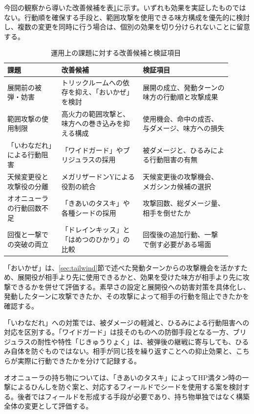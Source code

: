 \documentclass[a4paper,10pt]{ltjsarticle}
\begin{document}
今回の観察から導いた改善候補を表\ref{tab:improvements}に示す。いずれも効果を実証したものではない。行動順を確保する手段と、範囲攻撃を使用できる味方構成を優先的に検討し、複数の変更を同時に行う場合は、個別の効果を切り分けられないことに留意する。

\begin{table}[t]
  \centering
  \caption{運用上の課題に対する改善候補と検証項目}
  \label{tab:improvements}
  \footnotesize
  \setlength{\tabcolsep}{3pt}
  \renewcommand{\arraystretch}{1.18}
  \begin{tabular}{@{}p{0.22\linewidth}p{0.33\linewidth}p{0.36\linewidth}@{}}
    \hline
    課題 & 改善候補 & 検証項目 \\
    \hline
    展開前の被弾・妨害 & トリックルームへの依存を抑え、「おいかぜ」を検討 & 展開の成立、発動ターンの味方の行動順と攻撃成果 \\
    範囲攻撃の使用制限 & 高火力の範囲攻撃と、味方への巻き込みを抑える構成 & 使用機会、命中の成否、与ダメージ、味方への損失 \\
    「いわなだれ」による行動阻害 & 「ワイドガード」やブリジュラスの採用 & 被ダメージと、ひるみによる行動阻害の有無 \\
    天候変更役と攻撃役の分離 & メガリザードンYによる役割の統合 & 天候変更後の攻撃機会、メガシンカ候補の選択 \\
    オオニューラの行動回数不足 & 「きあいのタスキ」や各種シードの採用 & 攻撃回数、総ダメージ量、相手を倒せたか \\
    回復と一撃での突破の両立 & 「ドレインキッス」と「はめつのひかり」の比較 & 回復後の追加行動、一撃で倒す必要がある場面 \\
    \hline
  \end{tabular}
\end{table}

「おいかぜ」は、\ref{sec:tailwind}節で述べた発動ターンからの攻撃機会を活かすため、展開役が相手より先に使用できるかと、効果を受けた味方が相手より先に攻撃できるかを併せて評価する。素早さの設定と展開役への妨害対策を具体化し、発動したターンに攻撃できたか、その攻撃によって相手の行動を阻止できたかを確認する。

「いわなだれ」への対策では、被ダメージの軽減と、ひるみによる行動阻害への対応を区別する。「ワイドガード」は技そのものへの防御手段となる一方、ブリジュラスの耐性や特性「じきゅうりょく」は、被弾後の継戦に寄与しても、ひるみ自体を防ぐものではない。相手が同じ技を繰り返すことへの抑止効果と、こちらが実際に行動できたかを分けて記録する。

オオニューラの持ち物については、「きあいのタスキ」によってHP満タン時の一撃によるひんしを防ぐ案と、対応するフィールドでシードを使用する案を検討する。後者ではフィールドを形成する手段が必要であり、持ち物単独ではなく構築全体の変更として評価する。
\end{document}
